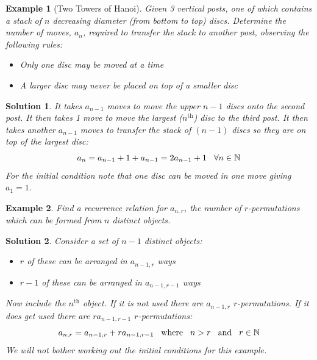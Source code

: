 \documentclass[12pt, letterpaper, onecolumn, conference, final]{IEEEtran}
\theoremstyle{definition}
\theoremstyle{plain}
\newtheorem{example}{Example}[section]
\newtheorem{solution}{Solution}[section]
\begin{document}
\begin{example}[Two Towers of Hanoi]
Given 3 vertical posts, one of which contains a stack of $n$ decreasing diameter (from bottom to top) discs. Determine the number of moves, $a_n$, required to transfer the stack to another post, observing the following rules:
\begin{itemize}

\vspace{.2cm}
\item[(1)]
Only one disc may be moved at a time

\vspace{.2cm}
\item[(2)]
A larger disc may never be placed on top of a smaller disc

\end{itemize}
\end{example}
\begin{solution}
It takes $a_{n-1}$ moves to move the upper $n-1$ discs onto the second post. It then takes 1 move to move the largest ($n^\text{th}$) disc to the third post. It then takes another $a_{n-1}$ moves to transfer the stack of $(n-1)$ discs so they are on top of the largest disc:
\begin{equation*}
a_n = a_{n-1} + 1 + a_{n-1} = 2a_{n-1} + 1 \hspace{.3cm} \forall n \in \mathbb{N}
\end{equation*}
For the initial condition note that one disc can be moved in one move giving $a_1=1$.
\end{solution}


\begin{example}
Find a recurrence relation for $a_{n,r}$, the number of $r$-permutations which can be formed from $n$ distinct objects.
\end{example}
\begin{solution}
Consider a set of $n-1$ distinct objects:
\begin{itemize}

\vspace{.2cm}
\item[(i)]
$r$ of these can be arranged in $a_{n-1,r}$ ways

\vspace{.2cm}
\item[(ii)]
$r-1$ of these can be arranged in $a_{n-1,r-1}$ ways

\end{itemize}
Now include the $n^\text{th}$ object. If it is not used there are $a_{n-1,r}$ $r$-permutations. If it does get used there are $r a_{n-1,r-1}$ $r$-permutations:
\begin{equation*}
a_{n,r} = a_{n-1,r} + ra_{n-1,r-1} \hspace{.3cm} \text{where} \hspace{.3cm} n > r \hspace{.3cm} \text{and} \hspace{.3cm} r \in \mathbb{N}
\end{equation*}
We will not bother working out the initial conditions for this example.
\end{solution}
\end{document}
